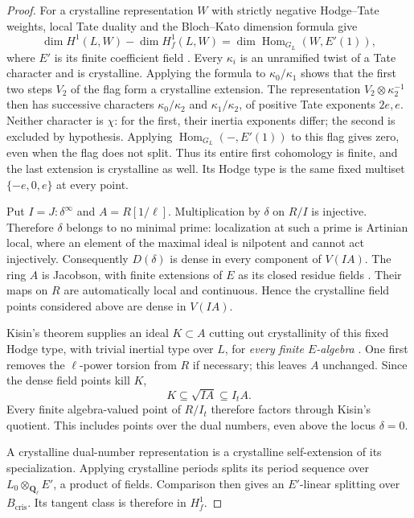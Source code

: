 \begin{proof}
For a crystalline representation $W$ with strictly negative
Hodge--Tate weights, local Tate duality and the Bloch--Kato dimension
formula give
\[
 \dim H^1(L,W)-\dim H_f^1(L,W)
               =\dim\operatorname{Hom}_{G_L}(W,E'(1)),
\]
where $E'$ is its finite coefficient field
\cite{bloch-kato-tamagawa,feng-local-bloch-kato}.
Every $\kappa_i$ is an unramified twist of a Tate character and is
crystalline.  Applying the formula to $\kappa_0/\kappa_1$ shows that
the first two steps $V_2$ of the flag form a crystalline extension.
The representation $V_2\otimes\kappa_2^{-1}$ then has successive
characters $\kappa_0/\kappa_2$ and $\kappa_1/\kappa_2$, of positive
Tate exponents $2e,e$.  Neither character is $\chi$: for the first,
their inertia exponents differ; the second is excluded by hypothesis.
Applying $\operatorname{Hom}_{G_L}(-,E'(1))$ to this flag gives zero,
even when the flag does not split.  Thus its entire first cohomology
is finite, and the last extension is crystalline as well.  Its Hodge
type is the same fixed multiset $\{-e,0,e\}$ at every point.

Put $I=J:\delta^\infty$ and $A=R[1/\ell]$.  Multiplication by
$\delta$ on $R/I$ is injective.  Therefore $\delta$ belongs to no
minimal prime: localization at such a prime is Artinian local,
where an element of the maximal ideal is nilpotent and cannot act
injectively.  Consequently $D(\delta)$ is dense in every component
of $V(IA)$.  The ring $A$ is Jacobson, with finite extensions of
$E$ as its closed residue fields
\cite{conrad-generic-deformation-fibres}.  Their maps on $R$ are
automatically local and continuous.  Hence the crystalline
field points considered above are dense in $V(IA)$.

Kisin's theorem supplies an ideal $K\subset A$ cutting out
crystallinity of this fixed Hodge type, with trivial inertial type
over $L$, for \emph{every finite $E$-algebra}
\cite{kisin-potentially-semistable}.
One first removes the $\ell$-power torsion from $R$ if necessary;
this leaves $A$ unchanged.  Since the dense field points kill $K$,
\[
                         K\subseteq\sqrt{IA}\subseteq I_tA.
\]
Every finite algebra-valued point of $R/I_t$ therefore factors
through Kisin's quotient.  This includes points over the dual
numbers, even above the locus $\delta=0$.

A crystalline dual-number representation is a crystalline
self-extension of its specialization.  Applying crystalline periods
splits its period sequence over $L_0\otimes_{\mathbf Q_\ell}E'$, a
product of fields.  Comparison then gives an $E'$-linear splitting
over $B_{\mathrm{cris}}$.  Its tangent class is therefore in $H_f^1$.
\end{proof}

